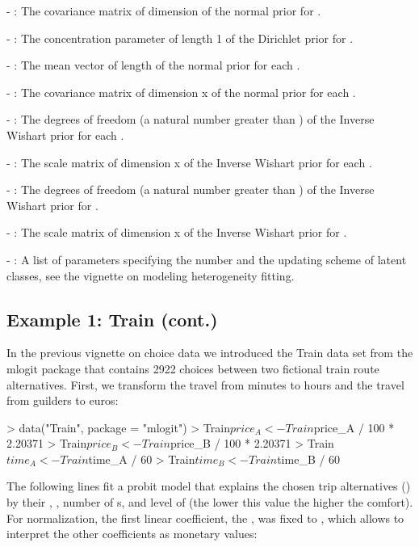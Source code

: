 \documentclass[article]{jss}
\begin{document}
  - : The covariance matrix of dimension  of the normal prior for .

  - : The concentration parameter of length 1 of the Dirichlet prior for .

  - : The mean vector of length  of the normal prior for each .

  - : The covariance matrix of dimension  x  of the normal prior for each .

  - : The degrees of freedom (a natural number greater than ) of the Inverse Wishart prior for each .

  - : The scale matrix of dimension  x  of the Inverse Wishart prior for each .

  - : The degrees of freedom (a natural number greater than ) of the Inverse Wishart prior for .

  - : The scale matrix of dimension  x  of the Inverse Wishart prior for .

- : A list of parameters specifying the number and the updating scheme of latent classes, see the vignette on modeling heterogeneity fitting.

\subsection{Example 1: Train (cont.)} \label{subsec:train_cont}

In the previous vignette on choice data we introduced the Train data set from the mlogit package \citep{Croissant:2020} that contains 2922 choices between two fictional train route alternatives. First, we transform the travel  from minutes to hours and the travel  from guilders to euros:

\begin{Schunk}
\begin{Sinput}
> data("Train", package = "mlogit")
> Train$price_A <- Train$price_A / 100 * 2.20371
> Train$price_B <- Train$price_B / 100 * 2.20371
> Train$time_A <- Train$time_A / 60
> Train$time_B <- Train$time_B / 60
\end{Sinput}
\end{Schunk}

The following lines fit a probit model that explains the chosen trip alternatives () by their , , number of  s, and level of  (the lower this value the higher the comfort). For normalization, the first linear coefficient, the , was fixed to , which allows to interpret the other coefficients as monetary values:
\end{document}
